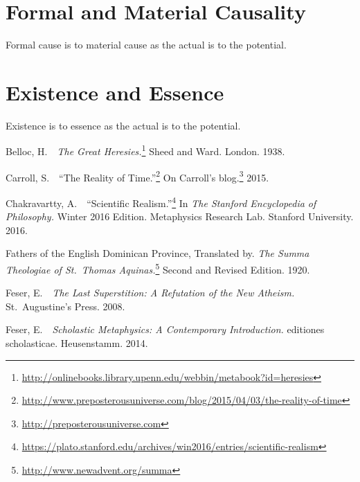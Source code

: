 \documentclass[twocolumn]{article}
\begin{document}
\section{Formal and Material Causality}

Formal cause is to material cause as the actual is to the potential.

\section{Existence and Essence}

Existence is to essence as the actual is to the potential.



\begin{thebibliography}{}

   \begin{small}

      Belloc, H.\ \ {\it The Great Heresies.}\footnote{%
         \url{http://onlinebooks.library.upenn.edu/webbin/metabook?id=heresies}
      }
      Sheed and Ward.  London.  1938.

      Carroll, S.\ \ ``The Reality of Time.''\footnote{%
         \url{http://www.preposterousuniverse.com/blog/2015/04/03/the-reality-of-time}%
      }
      On Carroll's blog.\footnote{\url{http://preposterousuniverse.com}}  2015.

      Chakravartty, A.\ \ ``Scientific Realism.''\footnote{%
         \url{https://plato.stanford.edu/archives/win2016/entries/scientific-realism}%
      }
      In {\it The Stanford Encyclopedia of Philosophy.}  Winter 2016 Edition.
      Metaphysics Research Lab.  Stanford University.  2016.

      Fathers of the English Dominican Province, Translated by. {\it The
      Summa Theologiae of St.~Thomas Aquinas.}\footnote{%
         \url{http://www.newadvent.org/summa}%
      }
      Second and Revised Edition.  1920.

      Feser, E.\ \ {\it The Last Superstition: A Refutation of the New
      Atheism.}  St.~Augustine's Press.  2008.

      Feser, E.\ \ {\it Scholastic Metaphysics: A Contemporary Introduction.}
      editiones scholasticae.  Heusenstamm.  2014.


\end{small}
\end{thebibliography}
\end{document}
